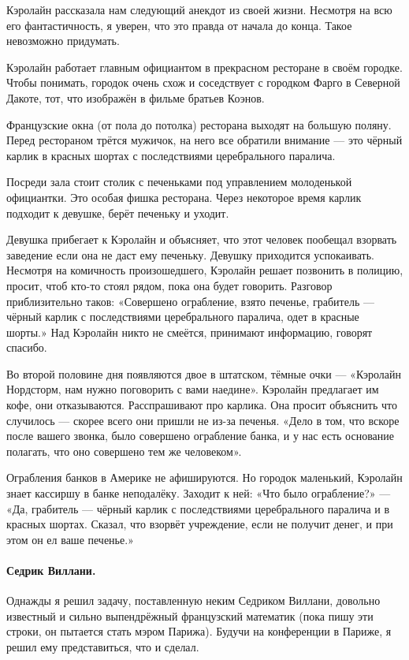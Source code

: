 \documentclass{book}
\begin{document}
{\sloppy

Кэролайн рассказала нам следующий анекдот из своей жизни.
Несмотря на всю его фантастичность, я уверен, что это правда от начала до конца.
Такое невозможно придумать.

}

Кэролайн работает главным официантом в прекрасном ресторане в своём городке.
Чтобы понимать, городок очень схож и соседствует с городком Фарго в Северной Дакоте, тот, что изображён в фильме братьев Коэнов.

Французские окна (от пола до потолка) ресторана выходят на большую поляну.
Перед рестораном трётся мужичок, на него все обратили внимание --- это чёрный карлик в красных шортах с последствиями церебрального паралича.

Посреди зала стоит столик с печеньками под управлением молоденькой официантки.
Это особая фишка ресторана.
Через некоторое время карлик подходит к девушке, берёт печеньку и уходит.

Девушка прибегает к Кэролайн и объясняет, что этот человек пообещал взорвать заведение если она не даст ему печеньку.
Девушку приходится успокаивать.
Несмотря на комичность произошедшего, Кэролайн решает позвонить в полицию, просит, чтоб кто-то стоял рядом, пока она будет говорить.
Разговор приблизительно таков:
«Совершено ограбление, взято печенье, грабитель --- чёрный карлик с последствиями церебрального паралича, одет в красные шорты.»
Над Кэролайн никто не смеётся, принимают информацию, говорят спасибо.

Во второй половине дня появляются двое в штатском, тёмные очки --- «Кэролайн Нордсторм, нам нужно поговорить с вами наедине».
Кэролайн предлагает им кофе, они отказываются.
Расспрашивают про карлика.
Она просит объяснить что случилось --- скорее всего они пришли не из-за печенья.
«Дело в том, что вскоре после вашего звонка, было совершено ограбление банка, и у нас есть основание полагать, что оно совершено тем же человеком».

Ограбления банков в Америке не афишируются.
Но городок маленький, Кэролайн знает кассиршу в банке неподалёку.
Заходит к ней: «Что было ограбление?» --- «Да, грабитель --- чёрный карлик с последствиями церебрального паралича и в красных шортах. Сказал, что взорвёт учреждение, если не получит денег, и
при этом он ел ваше печенье.»

\paragraph{Седрик Виллани.}
Однажды я решил задачу, поставленную неким Седриком Виллани, довольно известный и сильно выпендрёжный французский математик (пока пишу эти строки, он пытается стать мэром Парижа).
Будучи на конференции в Париже, я решил ему представиться, что и сделал.
\end{document}
